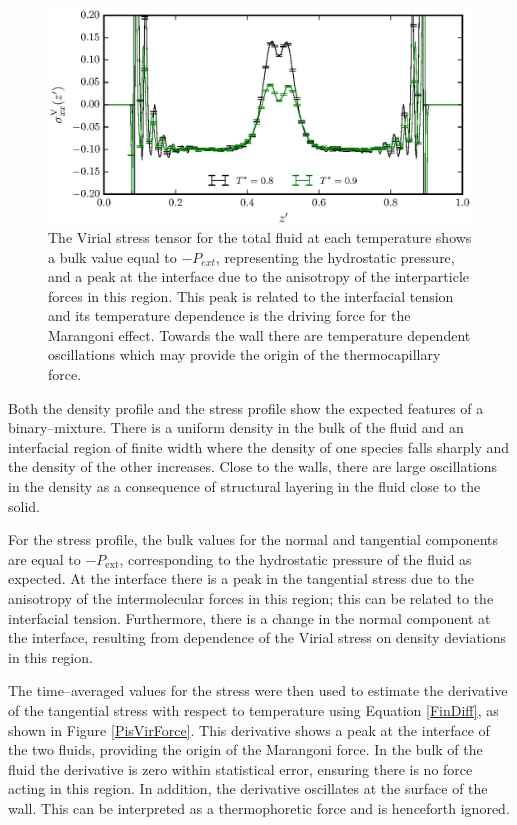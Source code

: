 \begin{figure}[h]
\centering
\includegraphics[scale=0.8]{PisVirStress}
\caption{The Virial stress tensor for the total fluid at each temperature shows a bulk value equal to $-P_{ext}$, representing the hydrostatic pressure, and a peak at the interface due to the anisotropy of the interparticle forces in this region.
This peak is related to the interfacial tension and its temperature dependence is the driving force for the Marangoni effect.
Towards the wall there are temperature dependent oscillations which may provide the origin of the thermocapillary force.
}
\label{PisVirStress}
\end{figure}

Both the density profile and the stress profile show the expected features of a binary--mixture. 
There is a uniform density in the bulk of the fluid and an interfacial region of finite width where the density of one species falls sharply and the density of the other increases.
Close to the walls, there are large oscillations in the density as a consequence of structural layering in the fluid close to the solid.

For the stress profile, the bulk values for the normal and tangential components are equal to $-P_{\mathrm{ext}}$, corresponding to the hydrostatic pressure of the fluid as expected.
At the interface there is a peak in the tangential stress due to the anisotropy of the intermolecular forces in this region; this can be related to the interfacial tension.\cite{Marchand2011}
Furthermore, there is a change in the normal component at the interface, resulting from dependence of the Virial stress on density deviations in this region.

The time--averaged values for the stress were then used to estimate the derivative of the tangential stress with respect to temperature using Equation \ref{FinDiff}, as shown in Figure \ref{PisVirForce}.
This derivative shows a peak at the interface of the two fluids, providing the origin of the Marangoni force.
In the bulk of the fluid the derivative is zero within statistical error, ensuring there is no force acting in this region.
In addition, the derivative oscillates at the surface of the wall.
This can be interpreted as a thermophoretic force and is henceforth ignored.

